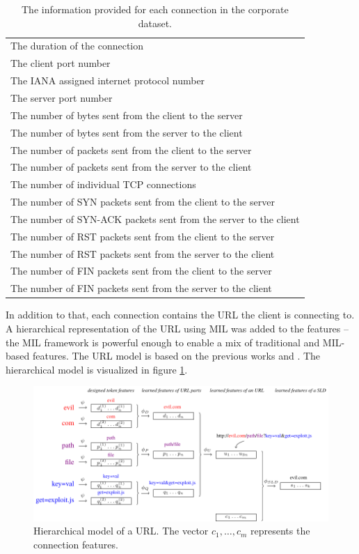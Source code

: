 \begin{table}
  \centering
  \begin{tabular}{l}
    \toprule
    The duration of the connection \\
    The client port number \\
    The IANA assigned internet protocol number \\
    The server port number \\
    The number of bytes sent from the client to the server \\
    The number of bytes sent from the server to the client \\
    The number of packets sent from the client to the server \\
    The number of packets sent from the server to the client \\
    The number of individual TCP connections \\
    The number of SYN packets sent from the client to the server \\
    The number of SYN-ACK packets sent from the server to the client \\
    The number of RST packets sent from the client to the server \\
    The number of RST packets sent from the server to the client \\
    The number of FIN packets sent from the client to the server \\
    The number of FIN packets sent from the server to the client \\
    \bottomrule
  \end{tabular}
  \caption{The information provided for each connection in the corporate dataset.}\label{tab:cisco-features}
\end{table}

In addition to that, each connection contains the URL the client is connecting to. A hierarchical representation of the URL using MIL was added to the features -- the MIL framework is powerful enough to enable a mix of traditional and MIL-based features. The URL model is based on the previous works \cite{dedic_hierarchicke_2017} and \cite{pevny_nested_2020}. The hierarchical model is visualized in figure \ref{fig:URL-model}.


\begin{figure}[H]
  \centering
  \includegraphics[width=\textwidth]{images/URL-model/URL-model.pdf}
  \caption{Hierarchical model of a URL. The vector \( c_1, \dots, c_m \) represents the connection features.}\label{fig:URL-model}
\end{figure}


